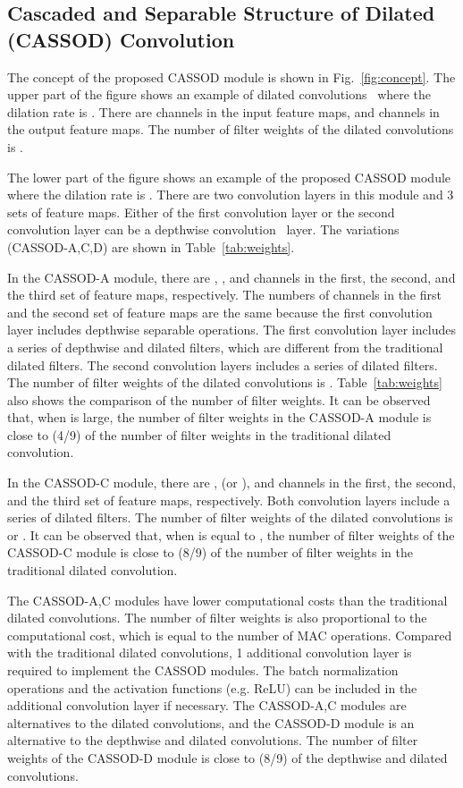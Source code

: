 \documentclass[10pt,twocolumn,letterpaper]{article}
\begin{document}
\subsection{Cascaded and Separable Structure of Dilated (CASSOD) Convolution}
\label{subsec:cassod}


The concept of the proposed CASSOD module is shown in Fig.~\ref{fig:concept}. The upper part of the figure shows an example of dilated convolutions~\cite{Wei18} where the dilation rate  is . There are  channels in the input feature maps, and  channels in the output feature maps. The number of filter weights of the dilated convolutions is . 

The lower part of the figure shows an example of the proposed CASSOD module where the dilation rate  is . There are two convolution layers in this module and 3 sets of feature maps. Either of the first convolution layer or the second convolution layer can be a depthwise convolution~\cite{Howard17} layer. The variations (CASSOD-A,C,D) are shown in Table~\ref{tab:weights}.

In the CASSOD-A module, there are , , and  channels in the first, the second, and the third set of feature maps, respectively. The numbers of channels in the first and the second set of feature maps are the same because the first convolution layer includes depthwise separable operations. The first convolution layer includes a series of  depthwise and dilated filters, which are different from the traditional  dilated filters. The second convolution layers includes a series of  dilated filters. The number of filter weights of the dilated convolutions is . Table~\ref{tab:weights} also shows the comparison of the number of filter weights. It can be observed that, when  is large, the number of filter weights in the CASSOD-A module is close to  (4/9) of the number of filter weights in the traditional dilated convolution. 



In the CASSOD-C module, there are ,  (or ), and  channels in the first, the second, and the third set of feature maps, respectively. Both convolution layers include a series of  dilated filters. The number of filter weights of the dilated convolutions is  or . It can be observed that, when  is equal to , the number of filter weights of the CASSOD-C module is close to  (8/9) of the number of filter weights in the traditional dilated convolution.

The CASSOD-A,C modules have lower computational costs than the traditional  dilated convolutions. The number of filter weights is also proportional to the computational cost, which is equal to the number of MAC operations. Compared with the traditional  dilated convolutions, 1 additional convolution layer is required to implement the CASSOD modules. The batch normalization operations and the activation functions (e.g. ReLU) can be included in the additional convolution layer if necessary. The CASSOD-A,C modules are alternatives to the dilated convolutions, and the CASSOD-D module is an alternative to the depthwise and dilated convolutions. The number of filter weights of the CASSOD-D module is close to  (8/9) of the depthwise and dilated convolutions.
\end{document}
